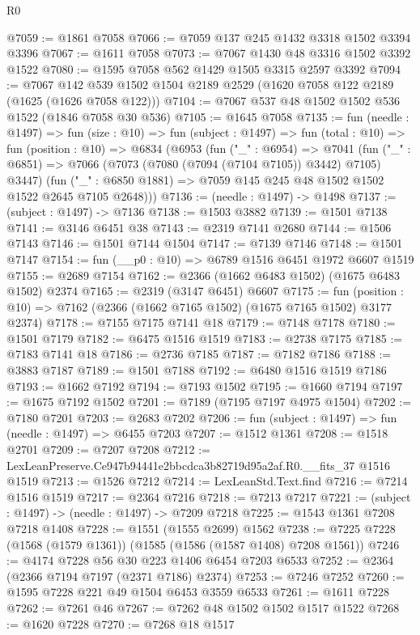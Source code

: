 \begin{lexlean}{R0}
\begin{coremodule}
@7059 := @1861 @7058
@7066 := @7059 @137 @245 @1432 @3318 @1502 @3394 @3396
@7067 := @1611 @7058
@7073 := @7067 @1430 @48 @3316 @1502 @3392 @1522
@7080 := @1595 @7058 @562 @1429 @1505 @3315 @2597 @3392
@7094 := @7067 @142 @539 @1502 @1504 @2189 @2529 (@1620 @7058 @122 @2189 (@1625 (@1626 @7058 @122)))
@7104 := @7067 @537 @48 @1502 @1502 @536 @1522 (@1846 @7058 @30 @536)
@7105 := @1645 @7058
@7135 := fun (needle : @1497) =>
  fun (size : @10) =>
  fun (subject : @1497) =>
  fun (total : @10) =>
  fun (position : @10) =>
  @6834
    (@6953
      (fun ("_" : @6954) =>
      @7041
        (fun ("_" : @6851) => @7066 (@7073 (@7080 (@7094 (@7104 @7105)) @3442) @7105) @3447)
        (fun ("_" : @6850 @1881) => @7059 @145 @245 @48 @1502 @1502 @1522 @2645 @7105 @2648)))
@7136 := (needle : @1497) -> @1498
@7137 := (subject : @1497) -> @7136
@7138 := @1503 @3882
@7139 := @1501 @7138
@7141 := @3146 @6451 @38
@7143 := @2319 @7141 @2680
@7144 := @1506 @7143
@7146 := @1501 @7144 @1504
@7147 := @7139 @7146
@7148 := @1501 @7147
@7154 := fun (__p0 : @10) => @6789 @1516 @6451 @1972 @6607 @1519
@7155 := @2689 @7154
@7162 := @2366 (@1662 @6483 @1502) (@1675 @6483 @1502) @2374
@7165 := @2319 (@3147 @6451) @6607
@7175 := fun (position : @10) => @7162 (@2366 (@1662 @7165 @1502) (@1675 @7165 @1502) @3177 @2374)
@7178 := @7155 @7175 @7141 @18
@7179 := @7148 @7178
@7180 := @1501 @7179
@7182 := @6475 @1516 @1519
@7183 := @2738 @7175
@7185 := @7183 @7141 @18
@7186 := @2736 @7185
@7187 := @7182 @7186
@7188 := @3883 @7187
@7189 := @1501 @7188
@7192 := @6480 @1516 @1519 @7186
@7193 := @1662 @7192
@7194 := @7193 @1502
@7195 := @1660 @7194
@7197 := @1675 @7192 @1502
@7201 := @7189 (@7195 @7197 @4975 @1504)
@7202 := @7180 @7201
@7203 := @2683 @7202
@7206 := fun (subject : @1497) => fun (needle : @1497) => @6455 @7203
@7207 := @1512 @1361
@7208 := @1518 @2701
@7209 := @7207 @7208
@7212 := LexLeanPreserve.Ce947b94441e2bbcdca3b82719d95a2af.R0.__fits_37 @1516 @1519
@7213 := @1526 @7212
@7214 := LexLeanStd.Text.find
@7216 := @7214 @1516 @1519
@7217 := @2364 @7216
@7218 := @7213 @7217
@7221 := (subject : @1497) -> (needle : @1497) -> @7209 @7218
@7225 := @1543 @1361 @7208 @7218 @1408
@7228 := @1551 (@1555 @2699) @1562
@7238 := @7225 @7228 (@1568 (@1579 @1361)) (@1585 (@1586 (@1587 @1408) @7208 @1561))
@7246 := @4174 @7228 @56 @30 @223 @1406 @6454 @7203 @6533
@7252 := @2364 (@2366 @7194 @7197 (@2371 @7186) @2374)
@7253 := @7246 @7252
@7260 := @1595 @7228 @221 @49 @1504 @6453 @3559 @6533
@7261 := @1611 @7228
@7262 := @7261 @46
@7267 := @7262 @48 @1502 @1502 @1517 @1522
@7268 := @1620 @7228
@7270 := @7268 @18 @1517

\end{coremodule}
\end{lexlean}
